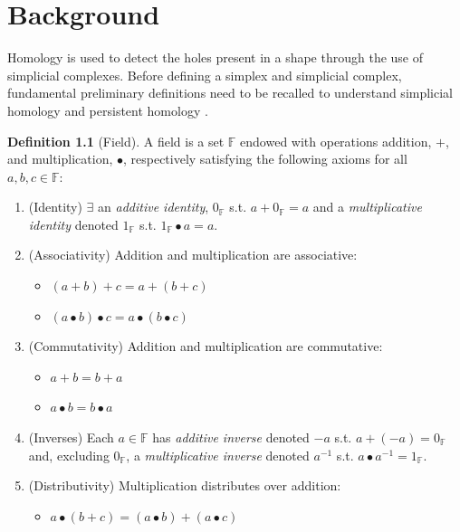 \documentclass[ma]{uncgdissertationexp}
\theoremstyle{plain}
\theoremstyle{definition}
\newtheorem{definition}[theorem]{Definition}
\theoremstyle{remark}
\begin{document}
\chapter{Background}

\par Homology is used to detect the holes present in a shape through the use of simplicial complexes. Before defining a simplex and simplicial complex, fundamental preliminary definitions need to be recalled to understand simplicial homology and persistent homology \cite{Needham_2019}.

\begin{definition}[Field]
\label{def:field}
A field is a set $\mathbb{F}$ endowed with operations addition, $+$, and multiplication, $\bullet$, respectively satisfying the following axioms for all $a,b,c\in\mathbb{F}$:
\begin{enumerate}
\item (Identity) $\exists$ an \textit{additive identity}, $0_{\mathbb{F}}$ s.t. $a+0_{\mathbb{F}}=a$ and a \textit{multiplicative identity} denoted $1_{\mathbb{F}}$ s.t. $1_{\mathbb{F}}\bullet a = a$.
\item (Associativity) Addition and multiplication are associative:
\begin{itemize}
\item $(a+b) + c = a + (b+c)$
\item $(a\bullet b) \bullet c = a \bullet (b \bullet c)$
\end{itemize}
\item (Commutativity) Addition and multiplication are commutative:
\begin{itemize}
\item $a + b = b + a$
\item $a \bullet b = b \bullet a$
\end{itemize}
\item (Inverses) Each $a \in \mathbb{F}$ has \textit{additive inverse} denoted $-a$ s.t. $a + (-a) = 0_{\mathbb{F}}$ and, excluding $0_\mathbb{F}$, a \textit{multiplicative inverse} denoted $a^{-1}$ s.t. $a \bullet a^{-1}=1_\mathbb{F}$.
\item (Distributivity) Multiplication distributes over addition:
\begin{itemize}
\item $a \bullet (b+c) = (a \bullet b) + (a \bullet c)$
\end{itemize}
\end{enumerate}
\end{definition}
\end{document}
